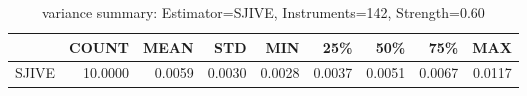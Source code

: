 \begin{table}[ht]
\centering
\caption{variance summary: Estimator=SJIVE, Instruments=142, Strength=0.60}
\begin{tabular}{lrrrrrrrr}
\toprule
 & COUNT & MEAN & STD & MIN & 25\% & 50\% & 75\% & MAX \\
\midrule
SJIVE & 10.0000 & 0.0059 & 0.0030 & 0.0028 & 0.0037 & 0.0051 & 0.0067 & 0.0117 \\
\bottomrule
\end{tabular}
\end{table}
